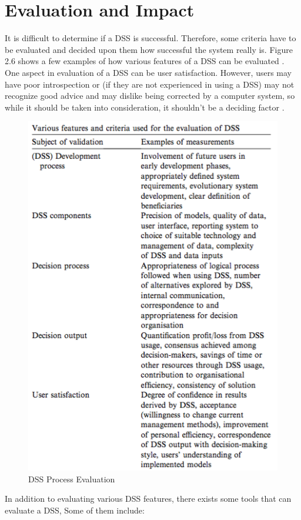 \section{Evaluation and Impact}
\label{sec:EvaluationAndImpact}
It is difficult to determine if a DSS is successful. Therefore, some criteria have to be evaluated and decided upon them how successful the system really is. Figure 2.6 shows a few examples of how various features of a DSS can be evaluated \cite{Mysiak2005203}. One aspect in evaluation of a DSS can be user satisfaction. However, users may have poor introspection or (if they are not experienced in using a DSS) may not recognize good advice and may dislike being corrected by a computer system, so while it should be taken into consideration, it shouldn't be a deciding factor \cite{Mysiak2005203}.
\begin{figure}[H]
\centering
\includegraphics[scale=0.6]{Images/Evaluation_Features_DSS.png}
\caption[DSS Process Evaluation]{DSS Process Evaluation \cite{Mysiak2005203}}
\end{figure}
In addition to evaluating various DSS features, there exists some tools that can evaluate a DSS, Some of them include:
